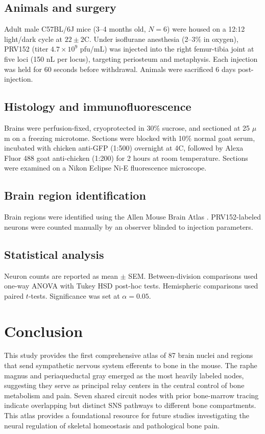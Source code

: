 \documentclass[11pt]{article}
\begin{document}
\subsection{Animals and surgery}

Adult male C57BL/6J mice (3--4 months old, $N = 6$) were housed on a 12:12 light/dark cycle at $22 \pm 2$\textdegree C. Under isoflurane anesthesia (2--3\% in oxygen), PRV152 (titer $4.7 \times 10^9$ pfu/mL) was injected into the right femur-tibia joint at five loci (150 nL per locus), targeting periosteum and metaphysis. Each injection was held for 60 seconds before withdrawal. Animals were sacrificed 6 days post-injection.

\subsection{Histology and immunofluorescence}

Brains were perfusion-fixed, cryoprotected in 30\% sucrose, and sectioned at 25 $\mu$m on a freezing microtome. Sections were blocked with 10\% normal goat serum, incubated with chicken anti-GFP (1:500) overnight at 4\textdegree C, followed by Alexa Fluor 488 goat anti-chicken (1:200) for 2 hours at room temperature. Sections were examined on a Nikon Eclipse Ni-E fluorescence microscope.

\subsection{Brain region identification}

Brain regions were identified using the Allen Mouse Brain Atlas \citep{oh2014}. PRV152-labeled neurons were counted manually by an observer blinded to injection parameters.

\subsection{Statistical analysis}

Neuron counts are reported as mean $\pm$ SEM. Between-division comparisons used one-way ANOVA with Tukey HSD post-hoc tests. Hemispheric comparisons used paired $t$-tests. Significance was set at $\alpha = 0.05$.

\section{Conclusion}

This study provides the first comprehensive atlas of 87 brain nuclei and regions that send sympathetic nervous system efferents to bone in the mouse. The raphe magnus and periaqueductal gray emerged as the most heavily labeled nodes, suggesting they serve as principal relay centers in the central control of bone metabolism and pain. Seven shared circuit nodes with prior bone-marrow tracing indicate overlapping but distinct SNS pathways to different bone compartments. This atlas provides a foundational resource for future studies investigating the neural regulation of skeletal homeostasis and pathological bone pain.



\end{document}
